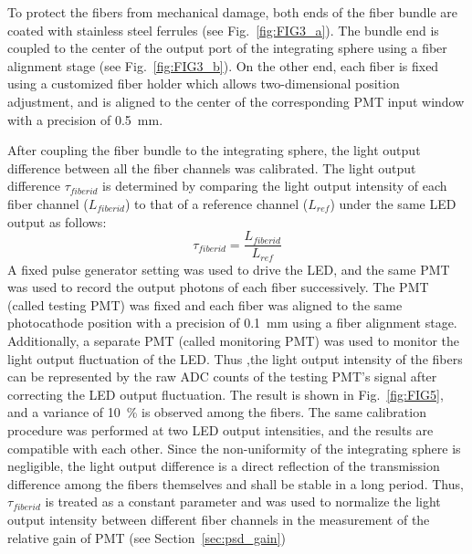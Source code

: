 \documentclass{nst}
\providecommand{\DIFadd}[1]{{\protect\color{yellow} #1}} %
\providecommand{\DIFaddbegin}{} %
\providecommand{\DIFaddend}{} %
\providecommand{\DIFdelbegin}{} %
\providecommand{\DIFdelend}{} %
\begin{document}
To protect the fibers from mechanical damage, both ends of the fiber bundle are coated with stainless steel ferrules (see Fig.~\ref{fig:FIG3_a}).
The bundle end is coupled to the center of the output port of the integrating sphere using a fiber alignment stage (see Fig.~\ref{fig:FIG3_b}).
On the other end, each fiber is fixed using a customized fiber holder which allows two-dimensional position adjustment, and is aligned to the center of the corresponding PMT input window with a precision of \SI{0.5}{\milli\meter}.

After coupling the fiber bundle to the integrating sphere, the light output difference between all the fiber channels was calibrated. 
The light output difference $\tau_{fiberid}$ is determined by comparing the light output intensity of each fiber channel ($L_{fiberid}$) to that of a reference channel ($L_{ref}$) under the same LED output as follows:
\begin{equation}
	\tau_{fiberid} = \frac{L_{fiberid}}{L_{ref}}
\end{equation} 
A fixed pulse generator setting was used to drive the LED, and the same PMT was used to record the output photons of each fiber successively.
The PMT (called testing PMT) was fixed and each fiber was aligned to the same photocathode position with a precision of \SI{0.1}{\milli\meter} using a fiber alignment stage.
Additionally, a separate PMT (called monitoring PMT) was used to monitor the light output fluctuation of the LED.
Thus ,the light output intensity of the fibers can be represented by the raw ADC counts of the testing PMT's signal after correcting the LED output fluctuation.
The result is shown in Fig.~\ref{fig:FIG5}, and a variance of \SI{10}{\percent} is observed among the fibers.
The same calibration procedure was performed at two LED output intensities, and the results are compatible with each other. 
\DIFdelbegin \DIFdelend \DIFaddbegin \DIFadd{Since }\DIFaddend the non-uniformity of the integrating sphere is negligible, the light output difference is a direct reflection of the transmission difference among the fibers themselves and shall be stable in a long period.
Thus, \DIFdelbegin \DIFdelend \DIFaddbegin \DIFadd{$\tau_{fiberid}$ }\DIFaddend is treated as a constant parameter and was used to normalize the light output intensity between different fiber channels in the measurement of the relative gain of PMT (see Section~\ref{sec:psd_gain})
\end{document}
